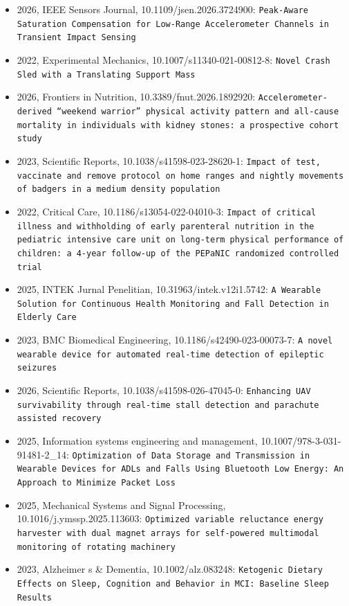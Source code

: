 \begin{itemize}
\item 2026, IEEE Sensors Journal, 10.1109/jsen.2026.3724900: \texttt{Peak-Aware Saturation Compensation for Low-Range Accelerometer Channels in Transient Impact Sensing}
\item 2022, Experimental Mechanics, 10.1007/s11340-021-00812-8: \texttt{Novel Crash Sled with a Translating Support Mass}
\item 2026, Frontiers in Nutrition, 10.3389/fnut.2026.1892920: \texttt{Accelerometer-derived ``weekend warrior'' physical activity pattern and all-cause mortality in individuals with kidney stones: a prospective cohort study}
\item 2023, Scientific Reports, 10.1038/s41598-023-28620-1: \texttt{Impact of test, vaccinate and remove protocol on home ranges and nightly movements of badgers in a medium density population}
\item 2022, Critical Care, 10.1186/s13054-022-04010-3: \texttt{Impact of critical illness and withholding of early parenteral nutrition in the pediatric intensive care unit on long-term physical performance of children: a 4-year follow-up of the PEPaNIC randomized controlled trial}
\item 2025, INTEK Jurnal Penelitian, 10.31963/intek.v12i1.5742: \texttt{A Wearable Solution for Continuous Health Monitoring and Fall Detection in Elderly Care}
\item 2023, BMC Biomedical Engineering, 10.1186/s42490-023-00073-7: \texttt{A novel wearable device for automated real-time detection of epileptic seizures}
\item 2026, Scientific Reports, 10.1038/s41598-026-47045-0: \texttt{Enhancing UAV survivability through real-time stall detection and parachute assisted recovery}
\item 2025, Information systems engineering and management, 10.1007/978-3-031-91481-2\_14: \texttt{Optimization of Data Storage and Transmission in Wearable Devices for ADLs and Falls Using Bluetooth Low Energy: An Approach to Minimize Packet Loss}
\item 2025, Mechanical Systems and Signal Processing, 10.1016/j.ymssp.2025.113603: \texttt{Optimized variable reluctance energy harvester with dual magnet arrays for self-powered multimodal monitoring of rotating machinery}
\item 2023, Alzheimer s \& Dementia, 10.1002/alz.083248: \texttt{Ketogenic Dietary Effects on Sleep, Cognition and Behavior in MCI: Baseline Sleep Results}

\end{itemize}
